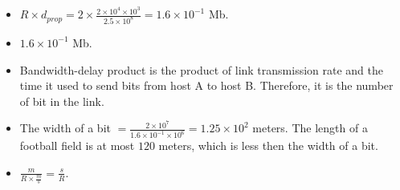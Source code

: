 \begin{pr}$ $
\begin{itemize}
\item $R\times d_{prop}=2\times\frac{2\times10^4\times10^3}{2.5\times10^8}=1.6\times10^{-1}$ Mb.
\item $1.6\times10^{-1}$ Mb.
\item Bandwidth-delay product is the product of link transmission rate and the time it used to send bits from host A to host B. Therefore, it is the number of bit in the link.
\item The width of a bit $=\frac{2\times10^7}{1.6\times10^{-1}\times10^6}=1.25\times10^2$ meters. The length of a football field is at most $120$ meters, which is less then the width of a bit.
\item $\frac m{R\times\frac ms}=\frac sR$.
\end{itemize}
\end{pr}
